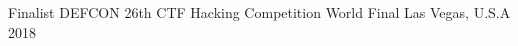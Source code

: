 

\begin{cventries}

  \cventry
    {Finalist} %
    {DEFCON 26th CTF Hacking Competition World Final} %
    {Las Vegas, U.S.A} %
    {2018} %

\end{cventries}
